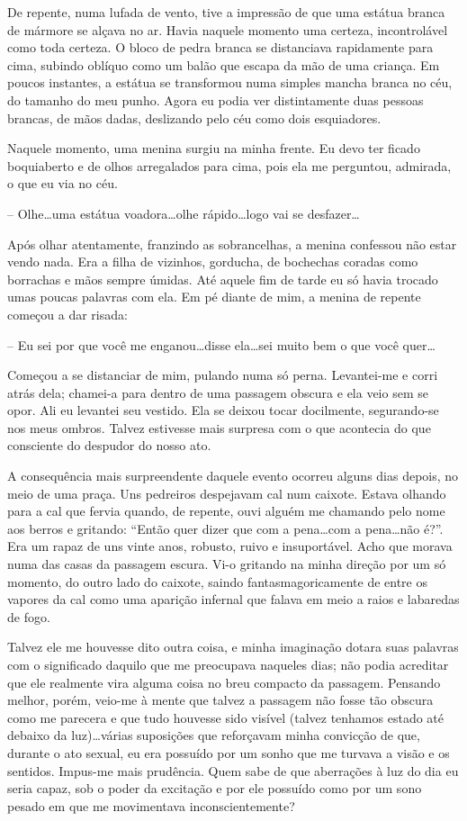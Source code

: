 De repente, numa lufada de vento, tive a impressão de que uma estátua branca de mármore se alçava no ar. Havia naquele momento uma certeza, incontrolável como toda certeza. O bloco de pedra branca se distanciava rapidamente para cima, subindo oblíquo como um balão que escapa da mão de uma criança. Em poucos instantes, a estátua se transformou numa simples mancha branca no céu, do tamanho do meu punho. Agora eu podia ver distintamente duas pessoas brancas, de mãos dadas, deslizando pelo céu como dois esquiadores.

Naquele momento, uma menina surgiu na minha frente. Eu devo ter ficado boquiaberto e de olhos arregalados para cima, pois ela me perguntou, admirada, o que eu via no céu.

-- Olhe\dots uma estátua voadora\dots olhe rápido\dots logo vai se desfazer\dots

Após olhar atentamente, franzindo as sobrancelhas, a menina confessou não estar vendo nada. Era a filha de vizinhos, gorducha, de bochechas coradas como borrachas e mãos sempre úmidas. Até aquele fim de tarde eu só havia trocado umas poucas palavras com ela. Em pé diante de mim, a menina de repente começou a dar risada:

-- Eu sei por que você me enganou\dots disse ela\dots sei muito bem o que você quer\dots

Começou a se distanciar de mim, pulando numa só perna. Levantei-me e corri atrás dela; chamei-a para dentro de uma passagem obscura e ela veio sem se opor. Ali eu levantei seu vestido. Ela se deixou tocar docilmente, segurando-se nos meus ombros. Talvez estivesse mais surpresa com o que acontecia do que consciente do despudor do nosso ato.

A consequência mais surpreendente daquele evento ocorreu alguns dias depois, no meio de uma praça. Uns pedreiros despejavam cal num caixote. Estava olhando para a cal que fervia quando, de repente, ouvi alguém me chamando pelo nome aos berros e gritando: ``Então quer dizer que com a pena\dots com a pena\dots não é?''. Era um rapaz de uns vinte anos, robusto, ruivo e insuportável. Acho que morava numa das casas da passagem escura. Vi-o gritando na minha direção por um só momento, do outro lado do caixote, saindo fantasmagoricamente de entre os vapores da cal como uma aparição infernal que falava em meio a raios e labaredas de fogo.

Talvez ele me houvesse dito outra coisa, e minha imaginação dotara suas palavras com o significado daquilo que me preocupava naqueles dias; não podia acreditar que ele realmente vira alguma coisa no breu compacto da passagem. Pensando melhor, porém, veio-me à mente que talvez a passagem não fosse tão obscura como me parecera e que tudo houvesse sido visível (talvez tenhamos estado até debaixo da luz)\dots várias suposições que reforçavam minha convicção de que, durante o ato sexual, eu era possuído por um sonho que me turvava a visão e os sentidos. Impus-me mais prudência. Quem sabe de que aberrações à luz do dia eu seria capaz, sob o poder da excitação e por ele possuído como por um sono pesado em que me movimentava inconscientemente?


